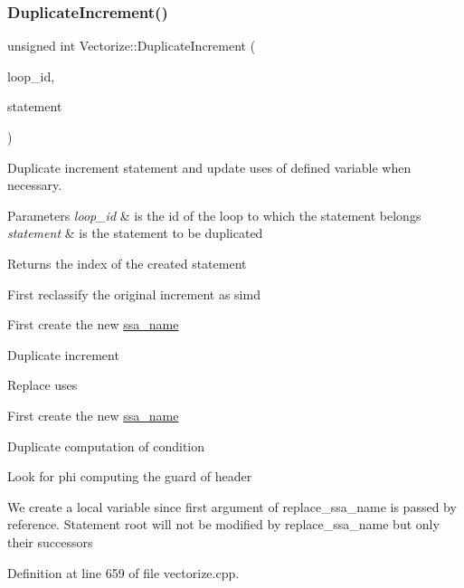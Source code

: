 \subsubsection{\texorpdfstring{Duplicate\+Increment()}{DuplicateIncrement()}}
{\footnotesize\ttfamily unsigned int Vectorize\+::\+Duplicate\+Increment (\begin{DoxyParamCaption}\item[{const unsigned int}]{loop\+\_\+id,  }\item[{const \hyperlink{tree__node_8hpp_a6ee377554d1c4871ad66a337eaa67fd5}{tree\+\_\+node\+Ref}}]{statement }\end{DoxyParamCaption})\hspace{0.3cm}{\ttfamily [private]}}



Duplicate increment statement and update uses of defined variable when necessary. 


\begin{DoxyParams}{Parameters}
{\em loop\+\_\+id} & is the id of the loop to which the statement belongs \\
\hline
{\em statement} & is the statement to be duplicated \\
\hline
\end{DoxyParams}
\begin{DoxyReturn}{Returns}
the index of the created statement 
\end{DoxyReturn}
First reclassify the original increment as simd

First create the new \hyperlink{structssa__name}{ssa\+\_\+name}

Duplicate increment

Replace uses

First create the new \hyperlink{structssa__name}{ssa\+\_\+name}

Duplicate computation of condition

Look for phi computing the guard of header

We create a local variable since first argument of replace\+\_\+ssa\+\_\+name is passed by reference. Statement root will not be modified by replace\+\_\+ssa\+\_\+name but only their successors 

Definition at line 659 of file vectorize.\+cpp.



